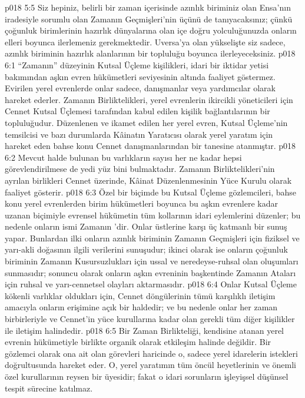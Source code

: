 \vs p018 5:5 Siz hepiniz, belirli bir zaman içerisinde azınlık biriminiz olan Ensa’nın iradesiyle sorumlu olan Zamanın Geçmişleri’nin üçünü de tanıyacaksınız; çünkü çoğunluk birimlerinin hazırlık dünyalarına olan içe doğru yolculuğunuzda onların elleri boyunca ilerlemeniz gerekmektedir. Uversa’ya olan yükselişte siz sadece, azınlık biriminin hazırlık alanlarının bir topluluğu boyunca ilerleyeceksiniz.
\vs p018 6:1 “Zamanın” düzeyinin Kutsal Üçleme kişilikleri, idari bir iktidar yetisi bakımından aşkın evren hükümetleri seviyesinin altında faaliyet göstermez. Evirilen yerel evrenlerde onlar sadece, danışmanlar veya yardımcılar olarak hareket ederler. Zamanın Birliktelikleri, yerel evrenlerin ikircikli yöneticileri için Cennet Kutsal Üçlemesi tarafından kabul edilen kişilik bağlantılarının bir topluluğudur. Düzenlenen ve ikamet edilen her yerel evren, Kutsal Üçleme’nin temsilcisi ve bazı durumlarda Kâinatın Yaratıcısı olarak yerel yaratım için hareket eden bahse konu Cennet danışmanlarından bir tanesine atanmıştır.
\vs p018 6:2 Mevcut halde bulunan bu varlıkların sayısı her ne kadar hepsi görevlendirilmese de yedi yüz bini bulmaktadır. Zamanın Birliktelikleri’nin ayrılan birlikleri Cennet üzerinde, Kâinat Düzenlenmesinin Yüce Kurulu olarak faaliyet gösterir.
\vs p018 6:3 Özel bir biçimde bu Kutsal Üçleme gözlemcileri, bahse konu yerel evrenlerden birim hükümetleri boyunca bu aşkın evrenlere kadar uzanan biçimiyle evrensel hükümetin tüm kollarının idari eylemlerini düzenler; bu nedenle onların ismi Zamanın ’dir. Onlar üstlerine karşı üç katmanlı bir sunuş yapar. Bunlardan ilki onların azınlık biriminin Zamanın Geçmişleri için fiziksel ve yarı\hyp{}akli doğasının ilgili verilerini sunuşudur; ikinci olarak ise onların çoğunluk biriminin Zamanın Kusursuzlukları için ussal ve neredeyse\hyp{}ruhsal olan oluşumları sunmasıdır; sonuncu olarak onların aşkın evreninin başkentinde Zamanın Ataları için ruhsal ve yarı\hyp{}cennetsel olayları aktarmasıdır.
\vs p018 6:4 Onlar Kutsal Üçleme kökenli varlıklar oldukları için, Cennet döngülerinin tümü karşılıklı iletişim amacıyla onların erişimine açık bir haldedir; ve bu nedenle onlar her zaman birbirleriyle ve Cennet’in yüce kurullarına kadar olan gerekli tüm diğer kişilikler ile iletişim halindedir.
\vs p018 6:5 Bir Zaman Birlikteliği, kendisine atanan yerel evrenin hükümetiyle birlikte organik olarak etkileşim halinde değildir. Bir gözlemci olarak ona ait olan görevleri haricinde o, sadece yerel idarelerin istekleri doğrultusunda hareket eder. O, yerel yaratımın tüm öncül heyetlerinin ve önemli özel kurullarının reysen bir üyesidir; fakat o idari sorunların işleyişsel düşünsel tespit sürecine katılmaz.
